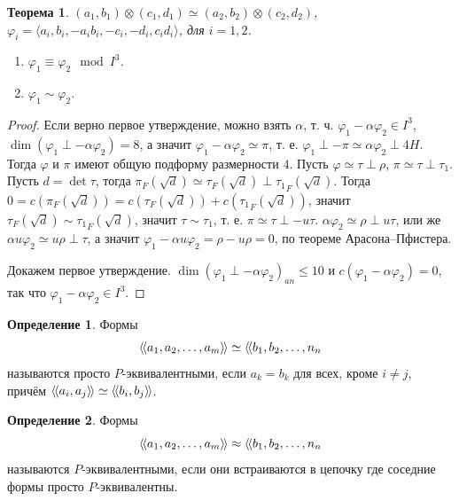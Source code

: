 \documentclass{article}
\newenvironment{enum}[2][\parindent]{\begin{enumerate}[nosep, wide, labelindent = #1, label = #2]}{\end{enumerate}}
\newtheorem*{theorem}{Теорема}
\theoremstyle{definition}
\newtheorem*{definition}{Определение}
\theoremstyle{remark}
\newcommand{\llangle}{\langle \hspace{-.5mm} \langle}
\newcommand{\rrangle}{\rangle \hspace{-.5mm} \rangle}
\begin{document}
\begin{theorem}
    $(a_1, b_1) \otimes (c_1, d_1) \simeq (a_2, b_2) \otimes (c_2, d_2)$, $\varphi_i = \langle a_i, b_i, -a_ib_i, -c_i, -d_i, c_i d_i \rangle$, для $i = 1, 2$.
    \begin{enum}{\roman*)}
        \item $\varphi_1 \equiv \varphi_2 \mod I^3$.
        \item $\varphi_1 \sim \varphi_2$.
    \end{enum}
\end{theorem}
\begin{proof}
    Если верно первое утверждение, можно взять $\alpha$, т. ч. $\varphi_1 - \alpha \varphi_2 \in I^3$, $\dim(\varphi_1 \perp -\alpha \varphi_2) = 8$, а значит $\varphi_1 - \alpha \varphi_2 \simeq \pi$, т. е. $\varphi_1 \perp -\pi \simeq \alpha \varphi_2 \perp 4H$. Тогда $\varphi$ и $\pi$ имеют общую подформу размерности $4$. Пусть $\varphi \simeq \tau \perp \rho$, $\pi \simeq \tau \perp \tau_1$. Пусть $d = \det \tau$, тогда $\pi_F(\sqrt{d}) \simeq \tau_F(\sqrt{d}) \perp {\tau_1}_F(\sqrt{d})$. Тогда $0 = c(\pi_F(\sqrt{d})) = c(\tau_F(\sqrt{d})) + c({\tau_1}_F(\sqrt{d}))$, значит $\tau_F(\sqrt{d}) \sim {\tau_1}_F(\sqrt{d})$, значит $\tau \sim \tau_1$, т. е. $\pi \simeq \tau \perp -u\tau$. $\alpha \varphi_2 \simeq \rho \perp u\tau$, или же $\alpha u \varphi_2 \simeq u\rho \perp \tau$, а значит $\varphi_1 - \alpha u \varphi_2 = \rho - u\rho = 0$, по теореме Арасона--Пфистера.

    Докажем первое утверждение. $\dim (\varphi_1 \perp -\alpha\varphi_2)_{an} \leq 10$ и $c(\varphi_1 -\alpha\varphi_2) = 0$, так что $\varphi_1 -\alpha\varphi_2 \in I^3$.
\end{proof}

\begin{definition}
    Формы
    $$\llangle a_1, a_2, \ldots, a_m \rrangle \simeq \llangle b_1, b_2, \ldots, n_n$$
    называются просто $P$-эквивалентными, если $a_k = b_k$ для всех, кроме $i \neq j$, причём $\llangle a_i, a_j \rrangle \simeq \llangle b_i, b_j \rrangle$.
\end{definition}

\begin{definition}
    Формы
    $$\llangle a_1, a_2, \ldots, a_m \rrangle \approx \llangle b_1, b_2, \ldots, n_n$$
    называются $P$-эквивалентными, если они встраиваются в цепочку где соседние формы просто $P$-эквивалентны. 
\end{definition}
\end{document}
